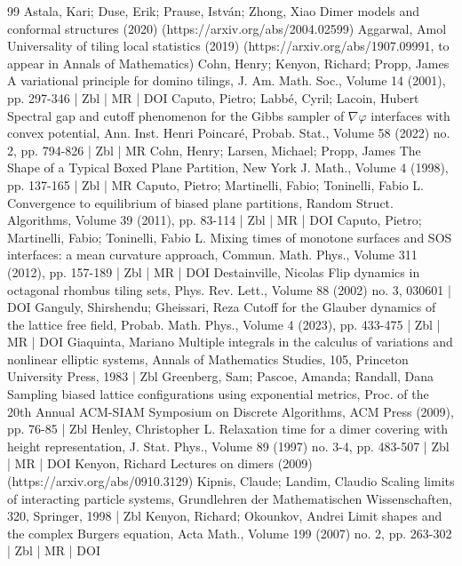 \begin{thebibliography}{99}
Astala, Kari; Duse, Erik; Prause, István; Zhong, Xiao Dimer models and conformal structures (2020) (https://arxiv.org/abs/2004.02599)
Aggarwal, Amol Universality of tiling local statistics (2019) (https://arxiv.org/abs/1907.09991, to appear in Annals of Mathematics)
Cohn, Henry; Kenyon, Richard; Propp, James A variational principle for domino tilings, J. Am. Math. Soc., Volume 14 (2001), pp. 297-346 | Zbl | MR | DOI
Caputo, Pietro; Labbé, Cyril; Lacoin, Hubert Spectral gap and cutoff phenomenon for the Gibbs sampler of $\nabla \varphi $ interfaces with convex potential, Ann. Inst. Henri Poincaré, Probab. Stat., Volume 58 (2022) no. 2, pp. 794-826 | Zbl | MR
Cohn, Henry; Larsen, Michael; Propp, James The Shape of a Typical Boxed Plane Partition, New York J. Math., Volume 4 (1998), pp. 137-165 | Zbl | MR
Caputo, Pietro; Martinelli, Fabio; Toninelli, Fabio L. Convergence to equilibrium of biased plane partitions, Random Struct. Algorithms, Volume 39 (2011), pp. 83-114 | Zbl | MR | DOI
Caputo, Pietro; Martinelli, Fabio; Toninelli, Fabio L. Mixing times of monotone surfaces and SOS interfaces: a mean curvature approach, Commun. Math. Phys., Volume 311 (2012), pp. 157-189 | Zbl | MR | DOI
Destainville, Nicolas Flip dynamics in octagonal rhombus tiling sets, Phys. Rev. Lett., Volume 88 (2002) no. 3, 030601 | DOI
Ganguly, Shirshendu; Gheissari, Reza Cutoff for the Glauber dynamics of the lattice free field, Probab. Math. Phys., Volume 4 (2023), pp. 433-475 | Zbl | MR | DOI
Giaquinta, Mariano Multiple integrals in the calculus of variations and nonlinear elliptic systems, Annals of Mathematics Studies, 105, Princeton University Press, 1983 | Zbl
Greenberg, Sam; Pascoe, Amanda; Randall, Dana Sampling biased lattice configurations using exponential metrics, Proc. of the 20th Annual ACM-SIAM Symposium on Discrete Algorithms, ACM Press (2009), pp. 76-85 | Zbl
Henley, Christopher L. Relaxation time for a dimer covering with height representation, J. Stat. Phys., Volume 89 (1997) no. 3-4, pp. 483-507 | Zbl | MR | DOI
Kenyon, Richard Lectures on dimers (2009) (https://arxiv.org/abs/0910.3129)
Kipnis, Claude; Landim, Claudio Scaling limits of interacting particle systems, Grundlehren der Mathematischen Wissenschaften, 320, Springer, 1998 | Zbl
Kenyon, Richard; Okounkov, Andrei Limit shapes and the complex Burgers equation, Acta Math., Volume 199 (2007) no. 2, pp. 263-302 | Zbl | MR | DOI

\end{thebibliography}
